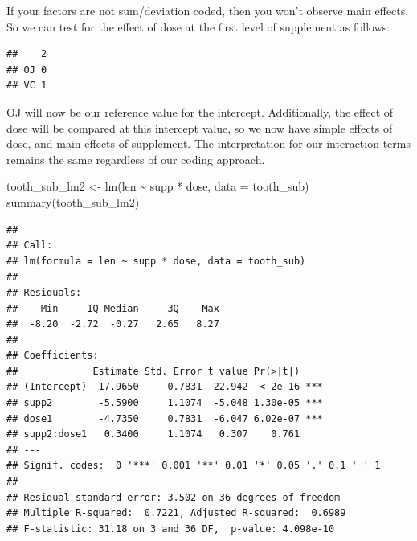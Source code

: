 \documentclass[
]{book}
\newenvironment{Shaded}{\begin{snugshade}}{\end{snugshade}}
\newcommand{\AttributeTok}[1]{\textcolor[rgb]{0.77,0.63,0.00}{#1}}
\newcommand{\FunctionTok}[1]{\textcolor[rgb]{0.00,0.00,0.00}{#1}}
\newcommand{\NormalTok}[1]{#1}
\newcommand{\OtherTok}[1]{\textcolor[rgb]{0.56,0.35,0.01}{#1}}
\newcommand{\SpecialCharTok}[1]{\textcolor[rgb]{0.00,0.00,0.00}{#1}}
\begin{document}
If your factors are not sum/deviation coded, then you won't observe main effects. So we can test for the effect of dose at the first level of supplement as follows:

\begin{Shaded}
\end{Shaded}

\begin{verbatim}
##    2
## OJ 0
## VC 1
\end{verbatim}

OJ will now be our reference value for the intercept. Additionally, the effect of dose will be compared at this intercept value, so we now have simple effects of dose, and main effects of supplement. The interpretation for our interaction terms remains the same regardless of our coding approach.

\begin{Shaded}
\begin{Highlighting}[]
\NormalTok{tooth\_sub\_lm2 }\OtherTok{\textless{}{-}} \FunctionTok{lm}\NormalTok{(len }\SpecialCharTok{\textasciitilde{}}\NormalTok{ supp }\SpecialCharTok{*}\NormalTok{ dose, }\AttributeTok{data =}\NormalTok{ tooth\_sub)}
\FunctionTok{summary}\NormalTok{(tooth\_sub\_lm2)}
\end{Highlighting}
\end{Shaded}

\begin{verbatim}
## 
## Call:
## lm(formula = len ~ supp * dose, data = tooth_sub)
## 
## Residuals:
##    Min     1Q Median     3Q    Max 
##  -8.20  -2.72  -0.27   2.65   8.27 
## 
## Coefficients:
##             Estimate Std. Error t value Pr(>|t|)    
## (Intercept)  17.9650     0.7831  22.942  < 2e-16 ***
## supp2        -5.5900     1.1074  -5.048 1.30e-05 ***
## dose1        -4.7350     0.7831  -6.047 6.02e-07 ***
## supp2:dose1   0.3400     1.1074   0.307    0.761    
## ---
## Signif. codes:  0 '***' 0.001 '**' 0.01 '*' 0.05 '.' 0.1 ' ' 1
## 
## Residual standard error: 3.502 on 36 degrees of freedom
## Multiple R-squared:  0.7221, Adjusted R-squared:  0.6989 
## F-statistic: 31.18 on 3 and 36 DF,  p-value: 4.098e-10
\end{verbatim}
\end{document}
